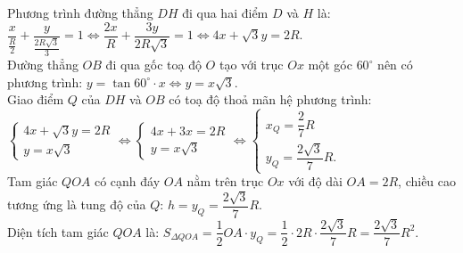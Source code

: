 \begin{bt}
{\begin{enumerate}[a)]
	Phương trình đường thẳng $DH$ đi qua hai điểm $D$ và $H$ là:
	$\dfrac{x}{\frac{R}{2}} + \dfrac{y}{\frac{2R\sqrt{3}}{3}} = 1 \Leftrightarrow \dfrac{2x}{R} + \dfrac{3y}{2R\sqrt{3}} = 1 \Leftrightarrow 4x + \sqrt{3}y = 2R$.\\
	Đường thẳng $OB$ đi qua gốc toạ độ $O$ tạo với trục $Ox$ một góc $60^\circ$ nên có phương trình:
	$y = \tan 60^\circ \cdot x \Leftrightarrow y = x\sqrt{3}$.\\
	Giao điểm $Q$ của $DH$ và $OB$ có toạ độ thoả mãn hệ phương trình:
	$\begin{cases} 4x + \sqrt{3}y = 2R \\ y = x\sqrt{3} \end{cases} \Leftrightarrow \begin{cases} 4x + 3x = 2R \\ y = x\sqrt{3} \end{cases} \Leftrightarrow \begin{cases} x_Q = \dfrac{2}{7}R \\ y_Q = \dfrac{2\sqrt{3}}{7}R. \end{cases}$\\
	Tam giác $QOA$ có cạnh đáy $OA$ nằm trên trục $Ox$ với độ dài $OA = 2R$, chiều cao tương ứng là tung độ của $Q$: $h = y_Q = \dfrac{2\sqrt{3}}{7}R$.\\
	Diện tích tam giác $QOA$ là:
	$S_{\Delta QOA} = \dfrac{1}{2} OA \cdot y_Q = \dfrac{1}{2} \cdot 2R \cdot \dfrac{2\sqrt{3}}{7}R = \dfrac{2\sqrt{3}}{7}R^2$.
\end{enumerate}
}
\end{bt}

